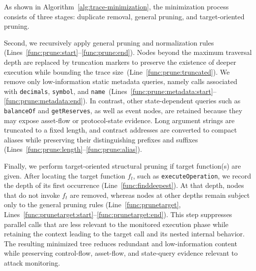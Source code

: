 As shown in Algorithm~\ref{alg:trace-minimization}, the minimization process consists of three stages: duplicate removal, general pruning, and target-oriented pruning.

Second, we recursively apply general pruning and normalization rules (Lines~\mbox{\ref{func:prune:start}--\ref{func:prune:end}}). Nodes beyond the maximum traversal depth are replaced by truncation markers to preserve the existence of deeper execution while bounding the trace size~(Line~\ref{func:prune:truncated}). We remove only low-information static metadata queries, namely calls associated with \texttt{decimals}, \texttt{symbol}, and \texttt{name}~(Lines~\mbox{\ref{func:prune:metadata:start}--\ref{func:prune:metadata:end}}). In contrast, other state-dependent queries such as \texttt{balanceOf} and \texttt{getReserves}, as well as event nodes, are retained because they may expose asset-flow or protocol-state evidence. 
Long argument strings are truncated to a fixed length, and contract addresses are converted to compact aliases while preserving their distinguishing prefixes and suffixes (Lines~\mbox{\ref{func:prune:length}--\ref{func:prune:alias}}).

Finally, we perform target-oriented structural pruning if target function(s) are given. After locating the target function \(f_t\), such as \texttt{executeOperation}, we record the depth of its first occurrence (Line~\ref{func:finddeepest}). At that depth, nodes that do not invoke \(f_t\) are removed, whereas nodes at other depths remain subject only to the general pruning rules (Line~\ref{func:prunetarget}, Lines~\mbox{\ref{func:prunetarget:start}--\ref{func:prunetarget:end}}). This step suppresses parallel calls that are less relevant to the monitored execution phase while retaining the context leading to the target call and its nested internal behavior. The resulting minimized tree reduces redundant and low-information content while preserving control-flow, asset-flow, and state-query evidence relevant to attack monitoring.


